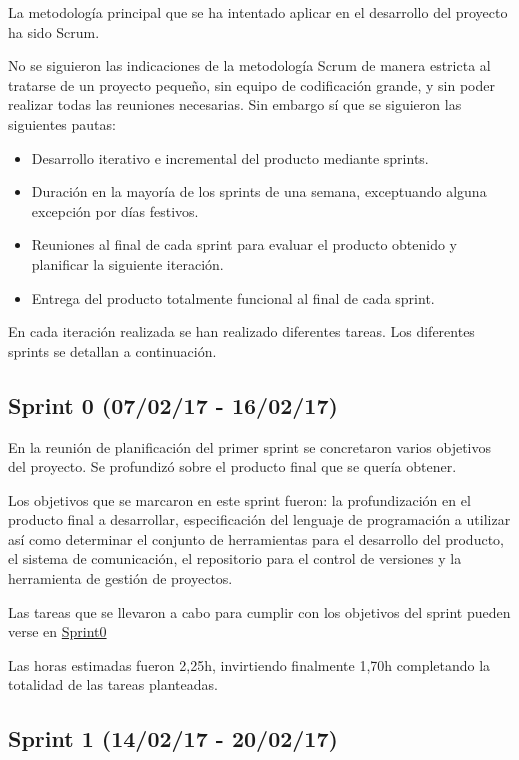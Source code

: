La metodología principal que se ha intentado aplicar en el desarrollo del proyecto ha sido Scrum.

No se siguieron las indicaciones de la metodología Scrum de manera estricta al tratarse de un proyecto pequeño, sin equipo de codificación grande, y sin poder realizar todas las reuniones necesarias. Sin embargo sí que se siguieron las siguientes pautas:

\begin{itemize}
\tightlist
\item
Desarrollo iterativo e incremental del producto mediante sprints.
\item
Duración en la mayoría de los sprints de una semana, exceptuando alguna excepción por días festivos.
\item
Reuniones al final de cada sprint para evaluar el producto obtenido y planificar la siguiente iteración.
\item
Entrega del producto totalmente funcional al final de cada sprint.
\end{itemize}

En cada iteración realizada se han realizado diferentes tareas. Los diferentes sprints se detallan a continuación.

\subsection{Sprint 0 (07/02/17 - 16/02/17)}

En la reunión de planificación del primer sprint se concretaron varios objetivos del proyecto. Se profundizó sobre el producto final que se quería obtener.

Los objetivos que se marcaron en este sprint fueron: la profundización en el producto final a desarrollar, especificación del lenguaje de programación a utilizar así como determinar el conjunto de herramientas para el desarrollo del producto, el sistema de comunicación, el repositorio para el control de versiones y la herramienta de gestión de proyectos.

Las tareas que se llevaron a cabo para cumplir con los objetivos del sprint pueden verse en \href{https://github.com/DanielSantidrian/UBUassistant/milestone/3?closed=1}{Sprint0}

Las horas estimadas fueron 2,25h, invirtiendo finalmente 1,70h completando la totalidad de las tareas planteadas.


\subsection{Sprint 1 (14/02/17 - 20/02/17)}

